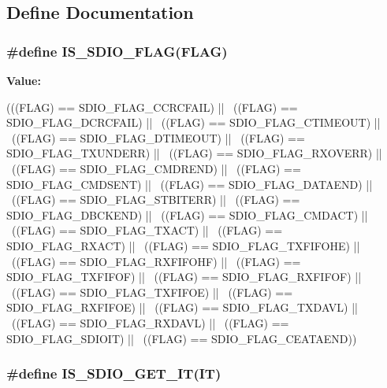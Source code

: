 \subsection{Define Documentation}
\hypertarget{group__SDIO__Flags_ga04b3c3c316e112172abacbf5e316f24a}{
\subsubsection[{IS\_\-SDIO\_\-FLAG}]{\setlength{\rightskip}{0pt plus 5cm}\#define IS\_\-SDIO\_\-FLAG(FLAG)}}
\label{group__SDIO__Flags_ga04b3c3c316e112172abacbf5e316f24a}
{\bfseries Value:}
\begin{DoxyCode}
(((FLAG)  == SDIO_FLAG_CCRCFAIL) || \
                            ((FLAG)  == SDIO_FLAG_DCRCFAIL) || \
                            ((FLAG)  == SDIO_FLAG_CTIMEOUT) || \
                            ((FLAG)  == SDIO_FLAG_DTIMEOUT) || \
                            ((FLAG)  == SDIO_FLAG_TXUNDERR) || \
                            ((FLAG)  == SDIO_FLAG_RXOVERR) || \
                            ((FLAG)  == SDIO_FLAG_CMDREND) || \
                            ((FLAG)  == SDIO_FLAG_CMDSENT) || \
                            ((FLAG)  == SDIO_FLAG_DATAEND) || \
                            ((FLAG)  == SDIO_FLAG_STBITERR) || \
                            ((FLAG)  == SDIO_FLAG_DBCKEND) || \
                            ((FLAG)  == SDIO_FLAG_CMDACT) || \
                            ((FLAG)  == SDIO_FLAG_TXACT) || \
                            ((FLAG)  == SDIO_FLAG_RXACT) || \
                            ((FLAG)  == SDIO_FLAG_TXFIFOHE) || \
                            ((FLAG)  == SDIO_FLAG_RXFIFOHF) || \
                            ((FLAG)  == SDIO_FLAG_TXFIFOF) || \
                            ((FLAG)  == SDIO_FLAG_RXFIFOF) || \
                            ((FLAG)  == SDIO_FLAG_TXFIFOE) || \
                            ((FLAG)  == SDIO_FLAG_RXFIFOE) || \
                            ((FLAG)  == SDIO_FLAG_TXDAVL) || \
                            ((FLAG)  == SDIO_FLAG_RXDAVL) || \
                            ((FLAG)  == SDIO_FLAG_SDIOIT) || \
                            ((FLAG)  == SDIO_FLAG_CEATAEND))
\end{DoxyCode}
\hypertarget{group__SDIO__Flags_gaef42c81f1f6250d8f9f438f4e16d1e98}{
\subsubsection[{IS\_\-SDIO\_\-GET\_\-IT}]{\setlength{\rightskip}{0pt plus 5cm}\#define IS\_\-SDIO\_\-GET\_\-IT(IT)}}
